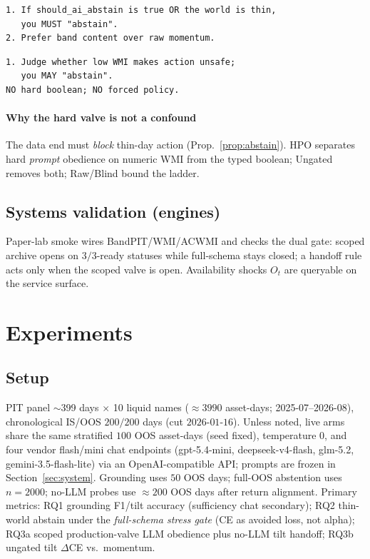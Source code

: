 \documentclass[sigconf,anonymous]{acmart}
\theoremstyle{acmdefinition}%
\theoremstyle{acmplain}%
\begin{document}
\begin{lstlisting}[caption={Compiled (excerpt): hard boolean.},label={lst:prompt-c}]
1. If should_ai_abstain is true OR the world is thin,
   you MUST "abstain".
2. Prefer band content over raw momentum.
\end{lstlisting}

\begin{lstlisting}[caption={Ungated (excerpt): soft judgment.},label={lst:prompt-u}]
1. Judge whether low WMI makes action unsafe;
   you MAY "abstain".
NO hard boolean; NO forced policy.
\end{lstlisting}

\paragraph{Why the hard valve is not a confound}
The data end must \emph{block} thin-day action (Prop.~\ref{prop:abstain}).
HPO separates hard \emph{prompt} obedience on numeric WMI from the typed boolean; Ungated removes both; Raw/Blind bound the ladder.

\subsection{Systems validation (engines)}
Paper-lab smoke wires BandPIT/WMI/ACWMI and checks the dual gate: scoped archive opens on \(3/3\)-ready statuses while full-schema stays closed; a handoff rule acts only when the scoped valve is open.
Availability shocks \(O_t\) are queryable on the service surface.

\FloatBarrier
\section{Experiments}
\label{sec:exp}

\subsection{Setup}
PIT panel \(\sim\)399 days \(\times\) 10 liquid names (\({\approx}3990\) asset-days; 2025-07--2026-08), chronological IS/OOS \(200/200\) days (cut \(2026\)-\(01\)-\(16\)).
Unless noted, live arms share the same stratified \(100\) OOS asset-days (seed fixed), temperature \(0\), and four vendor flash/mini chat endpoints (gpt-5.4-mini, deepseek-v4-flash, glm-5.2, gemini-3.5-flash-lite) via an OpenAI-compatible API; prompts are frozen in Section~\ref{sec:system}.
Grounding uses \(50\) OOS days; full-OOS abstention uses \(n{=}2000\); no-LLM probes use \({\approx}200\) OOS days after return alignment.
Primary metrics: RQ1 grounding F1/tilt accuracy (sufficiency chat secondary); RQ2 thin-world abstain under the \emph{full-schema stress gate} (CE as avoided loss, not alpha); RQ3a scoped production-valve LLM obedience plus no-LLM tilt handoff; RQ3b ungated tilt \(\Delta\)CE vs.\ momentum.
\end{document}
